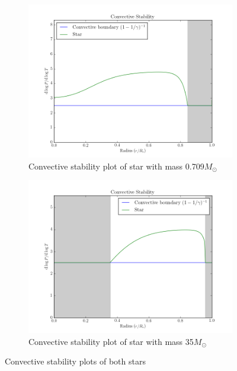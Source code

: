 \documentclass[11pt]{article}
\begin{document}
\begin{figure}[h!]
\centering
\begin{subfigure}{.5\textwidth}
  \centering
  \includegraphics[scale=0.5]{plots/star_comp-_X-0.73,Y-0.25,Z-0.02__Tc-9000000.0/dlogP_dlogT.png}
  \caption{Convective stability plot of star with mass 0.709$M_\odot$}
  \label{fig:cssmall}
\end{subfigure}%
\begin{subfigure}{.5\textwidth}
  \centering
  \includegraphics[scale=0.5]{plots/star_comp-_X-0.73,Y-0.25,Z-0.02__Tc-33000000.0/dlogP_dlogT.png}
  \caption{Convective stability plot of star with mass 35$M_\odot$}
  \label{fig:csbig}
\end{subfigure}
\caption{Convective stability plots of both stars}
\label{fig:cs}
\end{figure}
\end{document}
